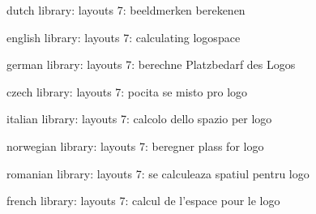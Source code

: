 

\unprotect

\startmessages  dutch  library: layouts
      7: beeldmerken berekenen
\stopmessages

\startmessages  english  library: layouts
      7: calculating logospace
\stopmessages

\startmessages  german  library: layouts
      7: berechne Platzbedarf des Logos
\stopmessages

\startmessages  czech  library: layouts
      7: pocita se misto pro logo
\stopmessages

\startmessages  italian  library: layouts
      7: calcolo dello spazio per logo
\stopmessages

\startmessages  norwegian  library: layouts
      7: beregner plass for logo
\stopmessages

\startmessages  romanian  library: layouts
      7: se calculeaza spatiul pentru logo
\stopmessages

\startmessages  french  library: layouts
      7: calcul de l'espace pour le logo
\stopmessages



\newif\ifnewlogos

